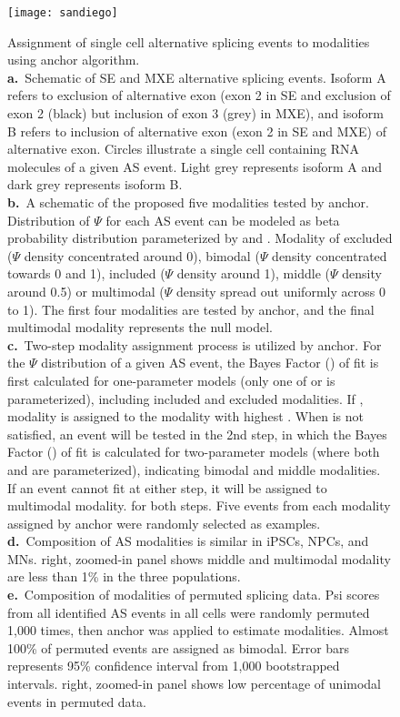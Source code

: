 \begin{figure}[h] 
  \centering
  \texttt{[image: sandiego]}
  \caption[Assignment of single cell alternative splicing events to modalities using anchor algorithm.]{
  Assignment of single cell alternative splicing events to modalities using anchor algorithm.\\
\textbf{a.}~Schematic of SE and MXE alternative splicing events. Isoform A refers to exclusion of alternative exon (exon 2 in SE and exclusion of exon 2 (black) but inclusion of exon 3 (grey) in MXE), and isoform B refers to inclusion of alternative exon (exon 2 in SE and MXE) of alternative exon. Circles illustrate a single cell containing RNA molecules of a given AS event. Light grey represents isoform A and dark grey represents isoform B. \\
\textbf{b.}~A schematic of the proposed five modalities tested by anchor. Distribution of $\Psi$ for each AS event can be modeled as beta probability distribution parameterized by  and . Modality of excluded ($\Psi$ density concentrated around 0), bimodal ($\Psi$ density concentrated towards 0 and 1), included ($\Psi$ density around 1), middle ($\Psi$ density around 0.5) or multimodal ($\Psi$ density spread out uniformly across 0 to 1). The first four modalities are tested by anchor, and the final multimodal modality represents the null model. \\
\textbf{c.}~Two-step modality assignment process is utilized by anchor. For the $\Psi$ distribution of a given AS event, the Bayes Factor () of fit is first calculated for one-parameter models (only one of  or is parameterized), including included and excluded modalities. If , modality is assigned to the modality with highest . When is not satisfied, an event will be tested in the 2nd step, in which the Bayes Factor () of fit is calculated for two-parameter models (where both  and are parameterized), indicating bimodal and middle modalities. If an event cannot fit at either step, it will be assigned to multimodal modality.  for both steps. Five events from each modality assigned by anchor were randomly selected as examples. 
\textbf{d.}~Composition of AS modalities is similar in iPSCs, NPCs, and MNs. right, zoomed-in panel shows middle and multimodal modality are less than 1\% in the three populations.\\
\textbf{e.}~Composition of modalities of permuted splicing data. Psi scores from all identified AS events in all cells were randomly permuted 1,000 times, then anchor was applied to estimate modalities. Almost 100\% of permuted events are assigned as bimodal. Error bars represents 95\% confidence interval from 1,000 bootstrapped intervals. right, zoomed-in panel shows low percentage of unimodal events in permuted data.
}
  \label{fig:anchor_overview}
\end{figure}

